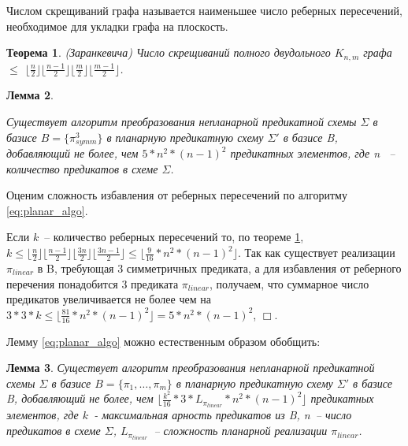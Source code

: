 \documentclass[12pt]{extarticle}
\newtheorem{theorem}{Теорема}[section]
\newtheorem{lemma}[theorem]{Лемма}
\newenvironment{proof}[1][Доказательство.]{\begin{trivlist}
\item[\hskip \labelsep {\bfseries #1}]}{\end{trivlist}}
\newenvironment{definition}[1][Определение.]{\begin{trivlist}
\item[\hskip \labelsep {\bfseries #1}]}{\end{trivlist}}
\begin{document}
\begin{definition}
Числом скрещиваний графа называется наименьшее число реберных пересечений, необходимое для укладки графа на плоскость.
\end{definition}

\begin{theorem}
\label{ZarankTheorem}
(Заранкевича) Число скрещиваний полного двудольного $K_{n,m}$ графа $\leq$
$\lfloor \frac{n}{2} \rfloor \lfloor \frac{n-1}{2} \rfloor \lfloor \frac{m}{2} \rfloor \lfloor \frac{m-1}{2} \rfloor$.
\cite{Zarank54}
\end{theorem}

\begin{lemma}
\label{eq:planar_algo_complexity}

Существует алгоритм преобразования непланарной предикатной схемы $\Sigma$ в базисе $B=\{\pi_{symm}^3\}$
в планарную предикатную схему $\Sigma'$ в базисе B, добавляющий не более, чем 
$5 * n^2*(n-1)^2 $ предикатных элементов, где n ~-- количество предикатов в схеме $\Sigma$.
\end{lemma}

\begin{proof}
Оценим сложность избавления от реберных пересечений по алгоритму \ref{eq:planar_algo}.

Если $k$~-- количество реберных пересечений то, по теореме \ref{ZarankTheorem}, 
$k \leq \lfloor \frac{n}{2} \rfloor \lfloor \frac{n-1}{2} \rfloor \lfloor \frac{3n}{2} \rfloor \lfloor \frac{3n-1}{2} \rfloor \le \lfloor \frac{9}{16} * n^2*(n-1)^2 \rfloor$.
Так как существует реализации $\pi_{linear}$ в B, требующая 3 симметричных предиката, а для избавления
от реберного перечения понадобится 3 предиката $\pi_{linear}$, получаем, 
что суммарное число предикатов увеличивается не более чем на
$3*3*k \leq \lfloor \frac{81}{16} * n^2 * (n-1)^2 \rfloor = 5 * n^2 * (n-1)^2$, $\Box$.
\end{proof}

Лемму \ref{eq:planar_algo} можно естественным образом обобщить:
\begin{lemma}
\label{general_planar_algo_complexity}
Существует алгоритм преобразования непланарной предикатной схемы $\Sigma$ в базисе $B = \{\pi_1, \dots, \pi_m \}$
в планарную предикатную схему $\Sigma'$ в базисе B, добавляющий не более, чем $\lfloor \frac{k^2}{16} * 3 * L_{\pi_{linear}} * n^2*(n-1)^2 \rfloor$ 
предикатных элементов, где $k$~- максимальная арность предикатов из B, n~-- число предикатов в схеме $\Sigma$, 
$L_{\pi_{linear}}$~-- сложность планарной реализации $\pi_{linear}$.
\end{lemma}
\end{document}
